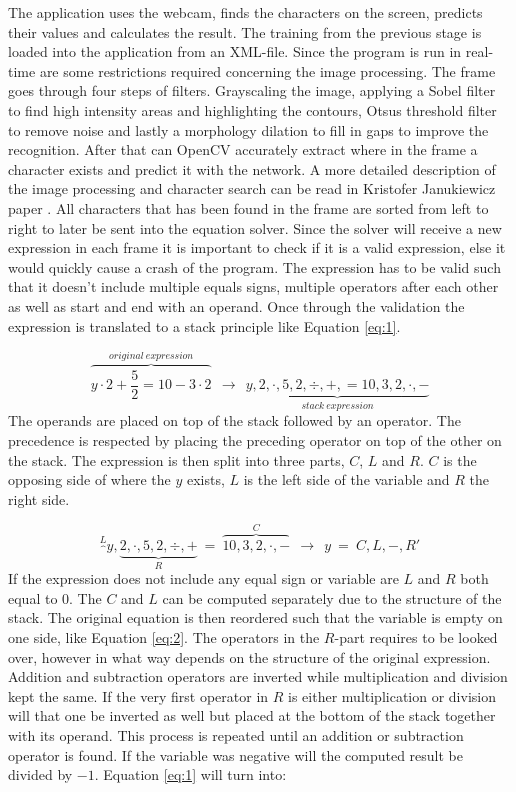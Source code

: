 \documentclass[12pt]{report}
\begin{document}
The application uses the webcam, finds the characters on the screen, predicts their values and calculates the result. The training from the previous stage is loaded into the application from an XML-file. Since the program is run in real-time are some restrictions required concerning the image processing. The frame goes through four steps of filters. Grayscaling the image, applying a Sobel filter to find high intensity areas and highlighting the contours, Otsu\textquotesingle s threshold filter to remove noise and lastly a morphology dilation to fill in gaps to improve the recognition. After that can OpenCV accurately extract where in the frame a character exists and predict it with the network. A more detailed description of the image processing and character search can be read in Kristofer Janukiewicz paper \cite{kristofer}.
\newline
\newline
All characters that has been found in the frame are sorted from left to right to later be sent into the equation solver. Since the solver will receive a new expression in each frame it is important to check if it is a valid expression, else it would quickly cause a crash of the program. The expression has to be valid such that it doesn't include multiple equals signs, multiple operators after each other as well as start and end with an operand. Once through the validation the expression is translated to a stack principle like Equation \ref{eq:1}.


\begin{equation}
  \label{eq:1}
  \overbrace{ y \cdot 2+\frac{5}{2}=10-3 \cdot 2}^{original \ expression} \ \ \to \ \ \underbrace{y,2,\cdot,5,2,\div,+,=10,3,2,\cdot,-}_{stack \ expression}
\end{equation}
The operands are placed on top of the stack followed by an operator. The precedence is respected by placing the preceding operator on top of the other on the stack. The expression is then split into three parts, $C$, $L$ and $R$. $C$ is the opposing side of where the $y$ exists, $L$ is the left side of the variable and $R$ the right side.

\begin{equation}
  \label{eq:2}
  \overbrace{}^{L}y, \underbrace{2, \cdot ,5,2,\div,+}_{R} \ = \ \overbrace{10,3,2, \cdot ,-}^{C} \ \ \to \ \ y \ = \ C,L,-,R'
\end{equation}
If the expression does not include any equal sign or variable are $L$ and $R$ both equal to $0$. The $C$ and $L$ can be computed separately due to the structure of the stack. The original equation is then reordered such that the variable is empty on one side, like Equation \ref{eq:2}. The operators in the $R$-part requires to be looked over, however in what way depends on the structure of the original expression. Addition and subtraction operators are inverted while multiplication and division kept the same. If the very first operator in $R$ is either multiplication or division will that one be inverted as well but placed at the bottom of the stack together with its operand. This process is repeated until an addition or subtraction operator is found. If the variable was negative will the computed result be divided by $-1$. Equation \ref{eq:1} will turn into:
\end{document}
